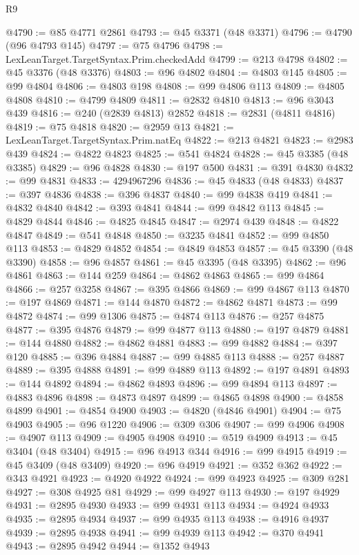 \begin{lexlean}{R9}
\begin{coremodule}
{{{{{{{{{{{{{{{{{{{{{{{{{{{{{{{{{{{{{{{{{{{{{{{{{{{{{{{{{{{{{{{{{{{{{{{{{{{{{{{{{{{{@4790 := @85 @4771 @2861
@4793 := @45 @3371 (@48 @3371)
@4796 := @4790 (@96 @4793 @145)
@4797 := @75 @4796
@4798 := LexLeanTarget.TargetSyntax.Prim.checkedAdd
@4799 := @213 @4798
@4802 := @45 @3376 (@48 @3376)
@4803 := @96 @4802
@4804 := @4803 @145
@4805 := @99 @4804
@4806 := @4803 @198
@4808 := @99 @4806 @113
@4809 := @4805 @4808
@4810 := @4799 @4809
@4811 := @2832 @4810
@4813 := @96 @3043 @439
@4816 := @240 (@2839 @4813) @2852
@4818 := @2831 (@4811 @4816)
@4819 := @75 @4818
@4820 := @2959 @13
@4821 := LexLeanTarget.TargetSyntax.Prim.natEq
@4822 := @213 @4821
@4823 := @2983 @439
@4824 := @4822 @4823
@4825 := @541 @4824
@4828 := @45 @3385 (@48 @3385)
@4829 := @96 @4828
@4830 := @197 @500
@4831 := @391 @4830
@4832 := @99 @4831
@4833 := 4294967296
@4836 := @45 @4833 (@48 @4833)
@4837 := @397 @4836
@4838 := @396 @4837
@4840 := @99 @4838 @419
@4841 := @4832 @4840
@4842 := @393 @4841
@4844 := @99 @4842 @113
@4845 := @4829 @4844
@4846 := @4825 @4845
@4847 := @2974 @439
@4848 := @4822 @4847
@4849 := @541 @4848
@4850 := @3235 @4841
@4852 := @99 @4850 @113
@4853 := @4829 @4852
@4854 := @4849 @4853
@4857 := @45 @3390 (@48 @3390)
@4858 := @96 @4857
@4861 := @45 @3395 (@48 @3395)
@4862 := @96 @4861
@4863 := @144 @259
@4864 := @4862 @4863
@4865 := @99 @4864
@4866 := @257 @3258
@4867 := @395 @4866
@4869 := @99 @4867 @113
@4870 := @197 @4869
@4871 := @144 @4870
@4872 := @4862 @4871
@4873 := @99 @4872
@4874 := @99 @1306
@4875 := @4874 @113
@4876 := @257 @4875
@4877 := @395 @4876
@4879 := @99 @4877 @113
@4880 := @197 @4879
@4881 := @144 @4880
@4882 := @4862 @4881
@4883 := @99 @4882
@4884 := @397 @120
@4885 := @396 @4884
@4887 := @99 @4885 @113
@4888 := @257 @4887
@4889 := @395 @4888
@4891 := @99 @4889 @113
@4892 := @197 @4891
@4893 := @144 @4892
@4894 := @4862 @4893
@4896 := @99 @4894 @113
@4897 := @4883 @4896
@4898 := @4873 @4897
@4899 := @4865 @4898
@4900 := @4858 @4899
@4901 := @4854 @4900
@4903 := @4820 (@4846 @4901)
@4904 := @75 @4903
@4905 := @96 @1220
@4906 := @309 @306
@4907 := @99 @4906
@4908 := @4907 @113
@4909 := @4905 @4908
@4910 := @519 @4909
@4913 := @45 @3404 (@48 @3404)
@4915 := @96 @4913 @344
@4916 := @99 @4915
@4919 := @45 @3409 (@48 @3409)
@4920 := @96 @4919
@4921 := @352 @362
@4922 := @343 @4921
@4923 := @4920 @4922
@4924 := @99 @4923
@4925 := @309 @281
@4927 := @308 @4925 @81
@4929 := @99 @4927 @113
@4930 := @197 @4929
@4931 := @2895 @4930
@4933 := @99 @4931 @113
@4934 := @4924 @4933
@4935 := @2895 @4934
@4937 := @99 @4935 @113
@4938 := @4916 @4937
@4939 := @2895 @4938
@4941 := @99 @4939 @113
@4942 := @370 @4941
@4943 := @2895 @4942
@4944 := @1352 @4943
}}}}}}}}}}}}}}}}}}}}}}}}}}}}}}}}}}}}}}}}}}}}}}}}}}}}}}}}}}}}}}}}}}}}}}}}}}}}}}}}}}}}
\end{coremodule}
\end{lexlean}
